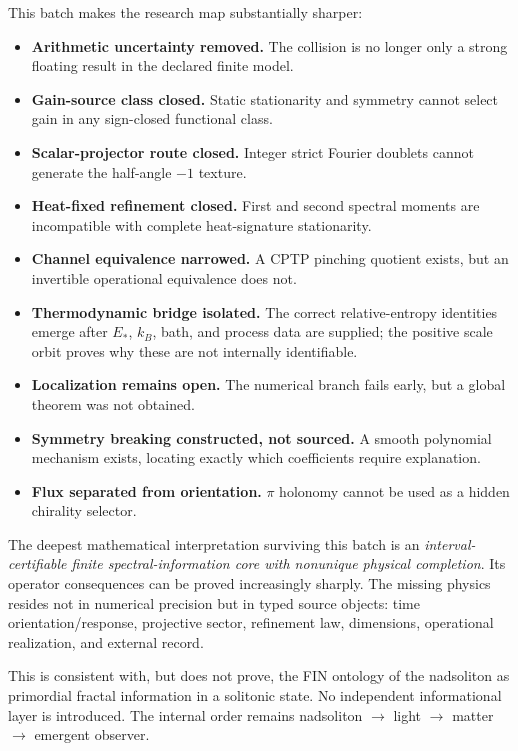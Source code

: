 \documentclass[11pt,a4paper]{article}
\begin{document}
This batch makes the research map substantially sharper:
\begin{itemize}
\item \textbf{Arithmetic uncertainty removed.} The collision is no longer only a strong floating result in the declared finite model.
\item \textbf{Gain-source class closed.} Static stationarity and symmetry cannot select gain in any sign-closed functional class.
\item \textbf{Scalar-projector route closed.} Integer strict Fourier doublets cannot generate the half-angle $-1$ texture.
\item \textbf{Heat-fixed refinement closed.} First and second spectral moments are incompatible with complete heat-signature stationarity.
\item \textbf{Channel equivalence narrowed.} A CPTP pinching quotient exists, but an invertible operational equivalence does not.
\item \textbf{Thermodynamic bridge isolated.} The correct relative-entropy identities emerge after $E_*$, $k_B$, bath, and process data are supplied; the positive scale orbit proves why these are not internally identifiable.
\item \textbf{Localization remains open.} The numerical branch fails early, but a global theorem was not obtained.
\item \textbf{Symmetry breaking constructed, not sourced.} A smooth polynomial mechanism exists, locating exactly which coefficients require explanation.
\item \textbf{Flux separated from orientation.} $\pi$ holonomy cannot be used as a hidden chirality selector.
\end{itemize}

The deepest mathematical interpretation surviving this batch is an \emph{interval-certifiable finite spectral-information core with nonunique physical completion}. Its operator consequences can be proved increasingly sharply. The missing physics resides not in numerical precision but in typed source objects: time orientation/response, projective sector, refinement law, dimensions, operational realization, and external record.

This is consistent with, but does not prove, the FIN ontology of the nadsoliton as primordial fractal information in a solitonic state. No independent informational layer is introduced. The internal order remains nadsoliton $\rightarrow$ light $\rightarrow$ matter $\rightarrow$ emergent observer.
\end{document}
